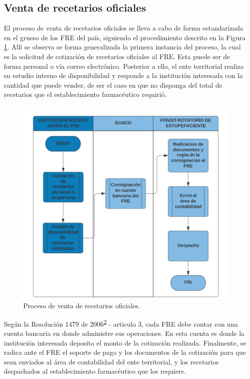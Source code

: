 \documentclass[
]{book}
\begin{document}
\hypertarget{venta-de-recetarios-oficiales}{%
\subsection{Venta de recetarios oficiales}\label{venta-de-recetarios-oficiales}}

El proceso de venta de recetarios oficiales se lleva a cabo de forma estandarizada en el grueso de los FRE del país, siguiendo el procedimiento descrito en la Figura \ref{fig:procesoVentaRec}. Allí se observa se forma generalizada la primera instancia del proceso, la cual es la solicitud de cotización de recetarios oficiales al FRE. Esta puede ser de forma personal o vía correo electrónico. Posterior a ello, el ente territorial realiza su estudio interno de disponibilidad y responde a la institución interesada con la cantidad que puede vender, de ser el caso en que no disponga del total de recetarios que el establecimiento farmacéutico requirió.

\begin{figure}

{\centering \includegraphics[width=0.8\linewidth]{figures/procesoVentaREC} 

}

\caption{Proceso de venta de recetarios oficiales.}\label{fig:procesoVentaRec}
\end{figure}

Según la Resolución 1479 de 2006\textsuperscript{\protect\hyperlink{ref-MSPS1479-2006}{2}} - articulo 3, cada FRE debe contar con una cuenta bancaria en donde administre sus operaciones. En esta cuenta es donde la institución interesada deposita el monto de la cotización realizada. Finalmente, se radica ante el FRE el soporte de pago y los documentos de la cotización para que sean enviados al área de contabilidad del ente territorial, y los recetarios despachados al establecimiento farmacéutico que los requiere.
\end{document}

